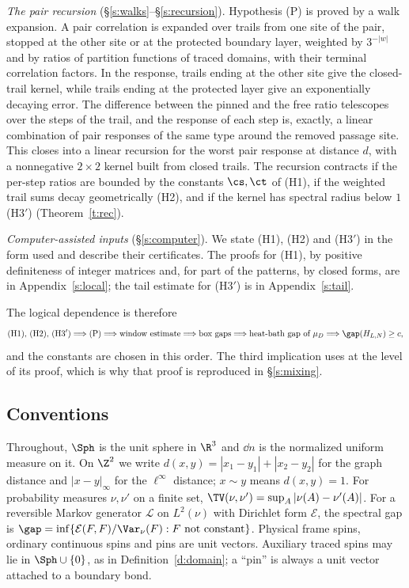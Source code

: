 \emph{The pair recursion} (\S\ref{s:walks}--\S\ref{s:recursion}). Hypothesis (P) is proved by a walk expansion. A pair correlation is expanded over trails from one site of the pair, stopped at the other site or at the protected boundary layer, weighted by $3^{-|w|}$ and by ratios of partition functions of traced domains, with their terminal correlation factors. In the response, trails ending at the other site give the closed-trail kernel, while trails ending at the protected layer give an exponentially decaying error. The difference between the pinned and the free ratio telescopes over the steps of the trail, and the response of each step is, exactly, a linear combination of pair responses of the same type around the removed passage site. This closes into a linear recursion for the worst pair response at distance $d$, with a nonnegative $2 \times 2$ kernel built from closed trails. The recursion contracts if the per-step ratios are bounded by the constants $\cs, \ct$ of (H1), if the weighted trail sums decay geometrically (H2), and if the kernel has spectral radius below $1$ (H3$'$) (Theorem~\ref{t:rec}).

\emph{Computer-assisted inputs} (\S\ref{s:computer}). We state (H1), (H2) and (H3$'$) in the form used and describe their certificates. The proofs for (H1), by positive definiteness of integer matrices and, for part of the patterns, by closed forms, are in Appendix~\ref{s:local}; the tail estimate for (H3$'$) is in Appendix~\ref{s:tail}.

The logical dependence is therefore
\begin{equation*}
\text{(H1), (H2), (H3$'$)} \Longrightarrow \text{(P)} \Longrightarrow \text{window estimate} \Longrightarrow \text{box gaps} \Longrightarrow \text{heat-bath gap of } \mu_D \Longrightarrow \gap(H_{L, N}) \ge c ,
\end{equation*}
and the constants are chosen in this order. The third implication uses \cite{MOS94} at the level of its proof, which is why that proof is reproduced in \S\ref{s:mixing}.

\subsection{Conventions}

Throughout, $\Sph$ is the unit sphere in $\R^3$ and $\dd n$ is the normalized uniform measure on it. On $\Z^2$ we write $d(x, y) = |x_1 - y_1| + |x_2 - y_2|$ for the graph distance and $|x - y|_\infty$ for the $\ell^\infty$ distance; $x \sim y$ means $d(x, y) = 1$. For probability measures $\nu, \nu'$ on a finite set, $\TV(\nu, \nu') = \sup_A |\nu(A) - \nu'(A)|$. For a reversible Markov generator $\mathcal L$ on $L^2(\nu)$ with Dirichlet form $\mathcal E$, the spectral gap is $\gap = \inf \{ \mathcal E(F, F) / \Var_\nu(F) : F \text{ not constant} \}$. Physical frame spins, ordinary continuous spins and pins are unit vectors. Auxiliary traced spins may lie in $\Sph \cup \{0\}$, as in Definition~\ref{d:domain}; a ``pin'' is always a unit vector attached to a boundary bond.
